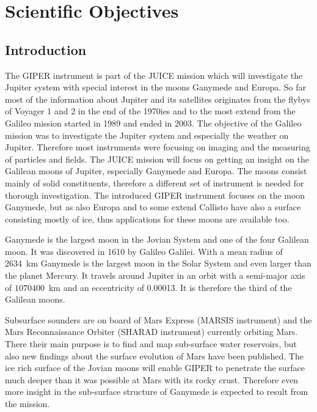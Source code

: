 \section{Scientific Objectives}


\subsection{Introduction\label{sub:Introduction-science}}

The GIPER instrument is part of the JUICE mission which will investigate
the Jupiter system with special interest in the moons Ganymede and
Europa. So far most of the information about Jupiter and its satellites
originates from the flybys of Voyager 1 and 2 in the end of the 1970ies
and to the most extend from the Galileo mission started in 1989 and
ended in 2003. The objective of the Galileo mission was to investigate
the Jupiter system and especially the weather on Jupiter. Therefore
most instruments were focusing on imaging and the measuring of particles
and fields. The JUICE mission will focus on getting an insight on
the Galilean moons of Jupiter, especially Ganymede and Europa. The
moons consist mainly of solid constituents, therefore a different
set of instrument is needed for thorough investigation. The introduced
GIPER instrument focuses on the moon Ganymede, but as also Europa
and to some extend Callisto have also a surface consisting mostly
of ice, thus applications for these moons are available too\cite{pater2010planetary}.

Ganymede is the largest moon in the Jovian System and one of the four
Galilean moon. It was discovered in 1610 by Galileo Galilei. With
a mean radius of 2634~km Ganymede is the largest moon in the Solar
System and even larger than the planet Mercury. It travels around
Jupiter in an orbit with a semi-major axis of $1070400$~km and an
eccentricity of 0.00013. It is therefore the third of the Galilean
moons\cite{pater2010planetary}. 

Subsurface sounders are on board of Mars Express (MARSIS instrument)
and the Mars Reconnaissance Orbiter (SHARAD instrument) currently
orbiting Mars. There their main purpose is to find and map sub-surface
water reservoirs\cite{Mouginot2010}, but also new findings about
the surface evolution of Mars have been published\cite{Watters2006}.
The ice rich surface of the Jovian moons will enable GIPER to penetrate
the surface much deeper than it was possible at Mars with its rocky
crust. Therefore even more insight in the sub-surface structure of
Ganymede is expected to result from the mission. 


